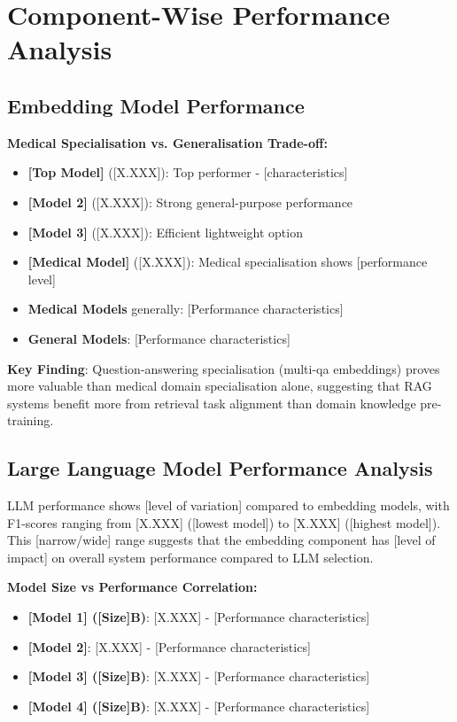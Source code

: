 \section{Component-Wise Performance Analysis}

\subsection{Embedding Model Performance}


\textbf{Medical Specialisation vs. Generalisation Trade-off:}
\begin{itemize}
    \item \textbf{[Top Model]} ([X.XXX]): Top performer - [characteristics]
    \item \textbf{[Model 2]} ([X.XXX]): Strong general-purpose performance
    \item \textbf{[Model 3]} ([X.XXX]): Efficient lightweight option
    \item \textbf{[Medical Model]} ([X.XXX]): Medical specialisation shows [performance level]
    \item \textbf{Medical Models} generally: [Performance characteristics]
    \item \textbf{General Models}: [Performance characteristics]
\end{itemize}

\textbf{Key Finding}: Question-answering specialisation (multi-qa embeddings) proves more valuable than medical domain specialisation alone, suggesting that RAG systems benefit more from retrieval task alignment than domain knowledge pre-training.

\subsection{Large Language Model Performance Analysis}

LLM performance shows [level of variation] compared to embedding models, with F1-scores ranging from [X.XXX] ([lowest model]) to [X.XXX] ([highest model]). This [narrow/wide] range suggests that the embedding component has [level of impact] on overall system performance compared to LLM selection.

\textbf{Model Size vs Performance Correlation:}
\begin{itemize}
    \item \textbf{[Model 1] ([Size]B)}: [X.XXX] - [Performance characteristics]
    \item \textbf{[Model 2]}: [X.XXX] - [Performance characteristics]
    \item \textbf{[Model 3] ([Size]B)}: [X.XXX] - [Performance characteristics]
    \item \textbf{[Model 4] ([Size]B)}: [X.XXX] - [Performance characteristics]
\end{itemize}


